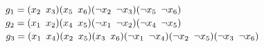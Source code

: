 \begin{center}
	\begin{minipage}[c]{.635\textwidth}
		$g_1 = (x_2 \enskip x_3)(x_5 \enskip x_6)(\neg x_2 \enskip \neg x_3)(\neg x_5 \enskip \neg x_6)$\\
		$g_2 = (x_1 \enskip x_2)(x_4 \enskip x_5)(\neg x_1 \enskip \neg x_2)(\neg x_4 \enskip \neg x_5)$\\
		$g_3 = (x_1 \enskip x_4)(x_2 \enskip x_5)(x_3 \enskip x_6)(\neg x_1 \enskip \neg x_4)(\neg x_2 \enskip \neg x_5)(\neg x_3 \enskip \neg x_6)$
	\end{minipage}
\end{center}










%




